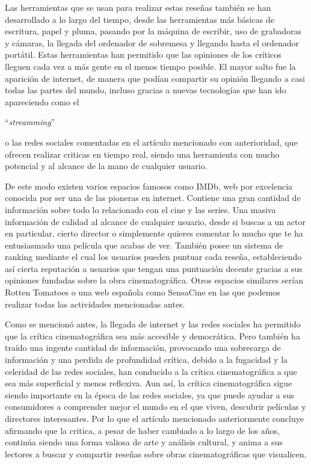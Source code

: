 Las  herramientas que se usan para realizar estas reseñas también se han desarrollado a lo largo del tiempo, desde las herramientas más básicas de escritura, papel y pluma, pasando por la máquina de escribir, uso de grabadoras y cámaras, la llegada del ordenador de sobremesa y llegando hasta el ordenador portátil. Estas herramientas han permitido que las opiniones de los críticos lleguen cada vez a más gente en el menos tiempo posible. El mayor salto fue la aparición de internet, de manera que podían compartir su opinión llegando a casi todas las partes del mundo, incluso gracias a nuevas tecnologías que han ido apareciendo como el \begin{otherlanguage}{english}``\textit{streamming}''\end{otherlanguage} o las redes sociales comentadas en el artículo mencionado con anterioridad, que ofrecen realizar criticas en tiempo real, siendo una herramienta con mucho potencial y al alcance de la mano de cualquier usuario.

De este modo existen varios espacios famosos como IMDb\cite{IMDbWeb}, web por excelencia conocida por ser una de las pioneras en internet. Contiene una gran cantidad de información sobre todo lo relacionado con el cine y las series. Una masiva información de calidad al alcance de cualquier usuario, desde si buscas a un actor en particular, cierto director o simplemente quieres comentar lo mucho que te ha entusiasmado una película que acabas de ver. También posee un sistema de ranking mediante el cual los usuarios pueden puntuar cada reseña, estableciendo así cierta reputación a usuarios que tengan una puntuación decente gracias a sus opiniones fundadas sobre la obra cinematográfica. Otros espacios similares serían Rotten Tomatoes\cite{RottenTWeb} o una web española como SensaCine\cite{SSweb} en las que podemos realizar todas las actividades mencionadas antes.

Como se mencionó antes, la llegada de internet y las redes sociales ha permitido que la crítica cinematográfica sea más accesible y democrática. Pero también ha traído una ingente cantidad de información, provocando una sobrecarga de información y una perdida de profundidad crítica, debido a la fugacidad y la celeridad de las redes sociales, han conducido a la crítica cinematográfica a que sea más superficial y menos reflexiva. Aun así, la crítica cinematográfica sigue siendo importante en la época de las redes sociales, ya que puede ayudar a sus consumidores a comprender mejor el mundo en el que viven, descubrir películas y directores interesantes. Por lo que el artículo mencionado anteriormente concluye afirmando que la critica, a pesar de haber cambiado a lo largo de los años, continúa siendo una forma valiosa de arte y análisis cultural, y anima a sus lectores a buscar y compartir reseñas sobre obras cinematográficas que visualicen.

